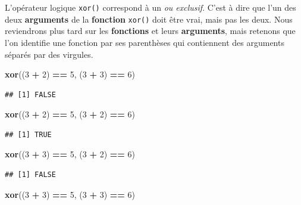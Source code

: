 \documentclass[]{book}
\newenvironment{Shaded}{\begin{snugshade}}{\end{snugshade}}
\newcommand{\DecValTok}[1]{\textcolor[rgb]{0.00,0.00,0.81}{#1}}
\newcommand{\KeywordTok}[1]{\textcolor[rgb]{0.13,0.29,0.53}{\textbf{#1}}}
\newcommand{\NormalTok}[1]{#1}
\newcommand{\OperatorTok}[1]{\textcolor[rgb]{0.81,0.36,0.00}{\textbf{#1}}}
\newcommand{\StringTok}[1]{\textcolor[rgb]{0.31,0.60,0.02}{#1}}
\begin{document}
L'opérateur logique \texttt{xor()} correspond à un \emph{ou exclusif}. C'est à dire que l'un des deux \textbf{arguments} de la \textbf{fonction} \texttt{xor()} doit être vrai, mais pas les deux. Nous reviendrons plus tard sur les \textbf{fonctions} et leurs \textbf{arguments}, mais retenons que l'on identifie une fonction par ses parenthèses qui contiennent des arguments séparés par des virgules.

\begin{Shaded}
\begin{Highlighting}[]
\KeywordTok{xor}\NormalTok{((}\DecValTok{3} \OperatorTok{+}\StringTok{ }\DecValTok{2}\NormalTok{) }\OperatorTok{==}\StringTok{ }\DecValTok{5}\NormalTok{, (}\DecValTok{3} \OperatorTok{+}\StringTok{ }\DecValTok{3}\NormalTok{) }\OperatorTok{==}\StringTok{ }\DecValTok{6}\NormalTok{)}
\end{Highlighting}
\end{Shaded}

\begin{verbatim}
## [1] FALSE
\end{verbatim}

\begin{Shaded}
\begin{Highlighting}[]
\KeywordTok{xor}\NormalTok{((}\DecValTok{3} \OperatorTok{+}\StringTok{ }\DecValTok{2}\NormalTok{) }\OperatorTok{==}\StringTok{ }\DecValTok{5}\NormalTok{, (}\DecValTok{3} \OperatorTok{+}\StringTok{ }\DecValTok{2}\NormalTok{) }\OperatorTok{==}\StringTok{ }\DecValTok{6}\NormalTok{)}
\end{Highlighting}
\end{Shaded}

\begin{verbatim}
## [1] TRUE
\end{verbatim}

\begin{Shaded}
\begin{Highlighting}[]
\KeywordTok{xor}\NormalTok{((}\DecValTok{3} \OperatorTok{+}\StringTok{ }\DecValTok{3}\NormalTok{) }\OperatorTok{==}\StringTok{ }\DecValTok{5}\NormalTok{, (}\DecValTok{3} \OperatorTok{+}\StringTok{ }\DecValTok{2}\NormalTok{) }\OperatorTok{==}\StringTok{ }\DecValTok{6}\NormalTok{)}
\end{Highlighting}
\end{Shaded}

\begin{verbatim}
## [1] FALSE
\end{verbatim}

\begin{Shaded}
\begin{Highlighting}[]
\KeywordTok{xor}\NormalTok{((}\DecValTok{3} \OperatorTok{+}\StringTok{ }\DecValTok{3}\NormalTok{) }\OperatorTok{==}\StringTok{ }\DecValTok{5}\NormalTok{, (}\DecValTok{3} \OperatorTok{+}\StringTok{ }\DecValTok{3}\NormalTok{) }\OperatorTok{==}\StringTok{ }\DecValTok{6}\NormalTok{)}
\end{Highlighting}
\end{Shaded}
\end{document}
